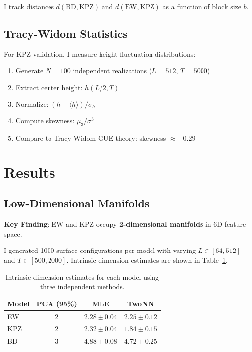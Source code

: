 \documentclass[aps,pre,twocolumn,superscriptaddress,showpacs]{revtex4-2}
\begin{document}
I track distances $d(\text{BD}, \text{KPZ})$ and $d(\text{EW}, \text{KPZ})$ as a function of block size $b$.

\subsection{Tracy-Widom Statistics}

For KPZ validation, I measure height fluctuation distributions:
\begin{enumerate}
\item Generate $N = 100$ independent realizations ($L = 512$, $T = 5000$)
\item Extract center height: $h(L/2, T)$
\item Normalize: $(h - \langle h \rangle) / \sigma_h$
\item Compute skewness: $\mu_3 / \sigma^3$
\item Compare to Tracy-Widom GUE theory: skewness $\approx -0.29$~\cite{Tracy1994}
\end{enumerate}

\section{Results}
\label{sec:results}

\subsection{Low-Dimensional Manifolds}
\label{sec:manifolds}

\textbf{Key Finding}: EW and KPZ occupy \textbf{2-dimensional manifolds} in 6D feature space.

I generated 1000 surface configurations per model with varying $L \in [64, 512]$ and $T \in [500, 2000]$. Intrinsic dimension estimates are shown in Table~\ref{tab:dimension}.

\begin{table}[h]
\caption{Intrinsic dimension estimates for each model using three independent methods.}
\label{tab:dimension}
\begin{ruledtabular}
\begin{tabular}{lccc}
Model & PCA (95\%) & MLE & TwoNN \\
\hline
EW & 2 & $2.28 \pm 0.04$ & $2.25 \pm 0.12$ \\
KPZ & 2 & $2.32 \pm 0.04$ & $1.84 \pm 0.15$ \\
BD & 3 & $4.88 \pm 0.08$ & $4.72 \pm 0.25$ \\
\end{tabular}
\end{ruledtabular}
\end{table}
\end{document}
